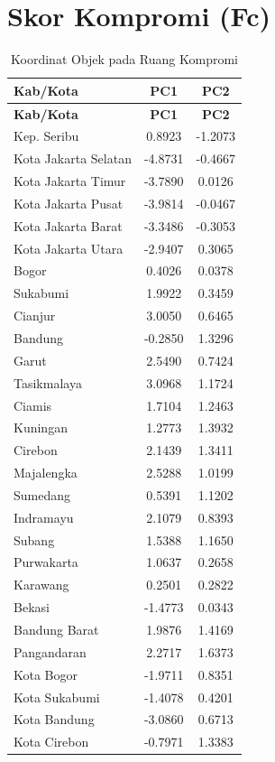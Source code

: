 \section*{Skor Kompromi (Fc)}
\begin{longtable}{|l|c|c|}
\caption{Koordinat Objek pada Ruang Kompromi} \label{tab:scores} \\
\hline
\textbf{Kab/Kota} & \textbf{PC1} & \textbf{PC2} \\
\hline
\endfirsthead
\hline
\textbf{Kab/Kota} & \textbf{PC1} & \textbf{PC2} \\
\hline
\endhead
\hline
\endfoot
Kep. Seribu & 0.8923 & -1.2073 \\
Kota Jakarta Selatan & -4.8731 & -0.4667 \\
Kota Jakarta Timur & -3.7890 & 0.0126 \\
Kota Jakarta Pusat & -3.9814 & -0.0467 \\
Kota Jakarta Barat & -3.3486 & -0.3053 \\
Kota Jakarta Utara & -2.9407 & 0.3065 \\
Bogor & 0.4026 & 0.0378 \\
Sukabumi & 1.9922 & 0.3459 \\
Cianjur & 3.0050 & 0.6465 \\
Bandung & -0.2850 & 1.3296 \\
Garut & 2.5490 & 0.7424 \\
Tasikmalaya & 3.0968 & 1.1724 \\
Ciamis & 1.7104 & 1.2463 \\
Kuningan & 1.2773 & 1.3932 \\
Cirebon & 2.1439 & 1.3411 \\
Majalengka & 2.5288 & 1.0199 \\
Sumedang & 0.5391 & 1.1202 \\
Indramayu & 2.1079 & 0.8393 \\
Subang & 1.5388 & 1.1650 \\
Purwakarta & 1.0637 & 0.2658 \\
Karawang & 0.2501 & 0.2822 \\
Bekasi & -1.4773 & 0.0343 \\
Bandung Barat & 1.9876 & 1.4169 \\
Pangandaran & 2.2717 & 1.6373 \\
Kota Bogor & -1.9711 & 0.8351 \\
Kota Sukabumi & -1.4078 & 0.4201 \\
Kota Bandung & -3.0860 & 0.6713 \\
Kota Cirebon & -0.7971 & 1.3383 \\

\end{longtable}
